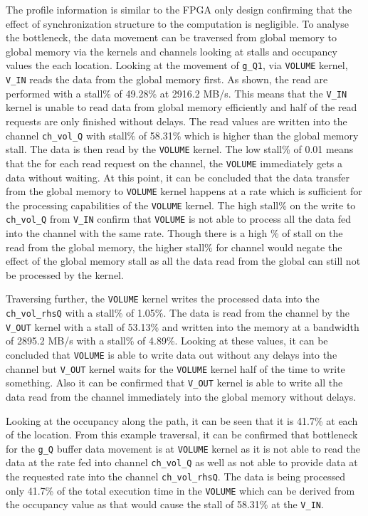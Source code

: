 The profile information is similar to the FPGA only design confirming
that the effect of synchronization structure to the computation is
negligible. To analyse the bottleneck, the data movement can be traversed
from global memory to global memory via the kernels and channels looking at
stalls and occupancy values the each location. Looking at the movement of
\texttt{g\_Q1}, via \texttt{VOLUME} kernel, \texttt{V\_IN} reads the data from the
global memory first. As shown, the read are performed with a stall\%
of 49.28\% at 2916.2 MB/s. This means that the \texttt{V\_IN} kernel is unable to read
data from global memory efficiently and half of the read requests
are only finished without delays. The read values are written into
the channel \texttt{ch\_vol\_Q} with stall\% of 58.31\% which is higher
than the global memory stall. The data is then read by the \texttt{VOLUME}
kernel. The low stall\% of 0.01 means that the for each read request
on the channel, the \texttt{VOLUME} immediately gets a data without
waiting. At this point, it can be concluded that the data transfer from the global
memory to \texttt{VOLUME} kernel happens at a rate which is sufficient for
the processing capabilities of the \texttt{VOLUME} kernel. The high stall\%
on the write to \texttt{ch\_vol\_Q} from \texttt{V\_IN} confirm that
\texttt{VOLUME} is not able to process all the data fed into the channel
with the same rate. Though there is a high \% of stall on the read
from the global memory, the higher stall\% for channel would
negate the effect of the global memory stall as all the data
read from the global can still not be processed by the kernel.

Traversing further, the \texttt{VOLUME} kernel writes the processed
data into the \texttt{ch\_vol\_rhsQ} with a stall\% of 1.05\%.
The data is read from the channel by the \texttt{V\_OUT} kernel
with a stall of 53.13\% and written into the memory at a
bandwidth of 2895.2 MB/s with a stall\% of 4.89\%. Looking at these
values, it can be concluded that \texttt{VOLUME} is able to write data
out without any delays into the channel but \texttt{V\_OUT} kernel
waits for the \texttt{VOLUME} kernel half of the time to write
something. Also it can be confirmed that \texttt{V\_OUT} kernel is
able to write all the data read from the channel immediately into
the global memory without delays.

Looking at the occupancy along the path, it can be seen that
it is 41.7\% at each of the location. From this example traversal,
it can be confirmed that bottleneck for the \texttt{g\_Q}
buffer data movement is at \texttt{VOLUME} kernel as it is not
able to read the data at the rate fed into channel
\texttt{ch\_vol\_Q} as well as not able to provide data at
the requested rate into the channel \texttt{ch\_vol\_rhsQ}.
The data is being processed only 41.7\% of the total execution
time in the \texttt{VOLUME} which can be derived from the occupancy
value as that would cause the stall of 58.31\% at the \texttt{V\_IN}.

